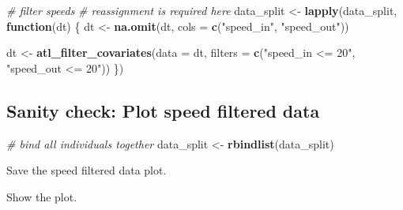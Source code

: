 \documentclass[
]{scrreprt}
\newenvironment{Shaded}{}{}
\newcommand{\CommentTok}[1]{\textcolor[rgb]{0.38,0.63,0.69}{\textit{#1}}}
\newcommand{\ControlFlowTok}[1]{\textcolor[rgb]{0.00,0.44,0.13}{\textbf{#1}}}
\newcommand{\DataTypeTok}[1]{\textcolor[rgb]{0.56,0.13,0.00}{#1}}
\newcommand{\KeywordTok}[1]{\textcolor[rgb]{0.00,0.44,0.13}{\textbf{#1}}}
\newcommand{\NormalTok}[1]{#1}
\newcommand{\StringTok}[1]{\textcolor[rgb]{0.25,0.44,0.63}{#1}}
\begin{document}
\begin{Shaded}
\begin{Highlighting}[]
\CommentTok{\# filter speeds}
\CommentTok{\# reassignment is required here}
\NormalTok{data\_split <{-}}\StringTok{ }\KeywordTok{lapply}\NormalTok{(data\_split, }\ControlFlowTok{function}\NormalTok{(dt) \{}
\NormalTok{  dt <{-}}\StringTok{ }\KeywordTok{na.omit}\NormalTok{(dt, }\DataTypeTok{cols =} \KeywordTok{c}\NormalTok{(}\StringTok{"speed\_in"}\NormalTok{, }\StringTok{"speed\_out"}\NormalTok{))}
  
\NormalTok{  dt <{-}}\StringTok{ }\KeywordTok{atl\_filter\_covariates}\NormalTok{(}\DataTypeTok{data =}\NormalTok{ dt,}
                              \DataTypeTok{filters =} \KeywordTok{c}\NormalTok{(}\StringTok{"speed\_in <= 20"}\NormalTok{,}
                                          \StringTok{"speed\_out <= 20"}\NormalTok{))}
\NormalTok{\})}
\end{Highlighting}
\end{Shaded}

\hypertarget{sanity-check-plot-speed-filtered-data}{%
\subsection{Sanity check: Plot speed filtered data}\label{sanity-check-plot-speed-filtered-data}}

\begin{Shaded}
\begin{Highlighting}[]
\CommentTok{\# bind all individuals together}
\NormalTok{data\_split <{-}}\StringTok{ }\KeywordTok{rbindlist}\NormalTok{(data\_split)}
\end{Highlighting}
\end{Shaded}

Save the speed filtered data plot.

Show the plot.
\end{document}
